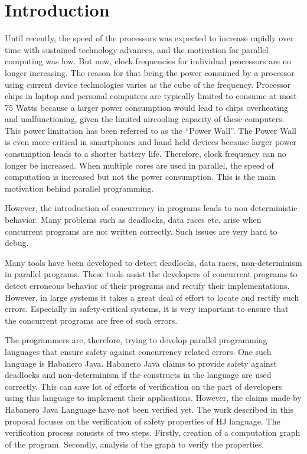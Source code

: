 \section{Introduction}

Until recently, the speed of the processors was expected to increase rapidly over time with sustained technology advances, and the motivation for parallel computing was low. But now, clock frequencies for individual processors are no longer increasing. The reason for that being the power consumed by a processor using current device technologies varies as the cube of the frequency. Processor chips in laptop and personal computers are typically limited to consume at most 75 Watts because a larger power consumption would lead to chips overheating and malfunctioning, given the limited air­cooling capacity of these computers. This power limitation has been referred to as the “Power Wall”. The Power Wall is even more critical in smart­phones and hand held devices because larger power consumption leads to a shorter battery life. Therefore, clock frequency can no longer be increased. When multiple cores are used in parallel, the speed of computation is increased but not the power consumption. This is the main motivation behind parallel programming.

 However, the introduction of concurrency in programs leads to non deterministic behavior. Many problems such as deadlocks, data races etc. arise when concurrent programs are not written correctly. Such issues are very hard to debug.
 
 Many tools have been developed to detect deadlocks, data races, non-determinism in parallel programs. These tools assist the developers of concurrent programs to detect erroneous behavior of their programs and rectify their implementations. However, in large systems it takes a great deal of effort to locate and rectify such errors. Especially in safety-critical systems, it is very important to ensure that the concurrent programs are free of such errors.
 
 The programmers are, therefore, trying to develop parallel programming languages that ensure safety against concurrency related errors. One such language is Habanero Java. Habanero Java claims to provide safety against deadlocks and non-determinism if the constructs in the language are used correctly. This can save lot of efforts of verification on the part of developers using this language to implement their applications. However, the claims made by Habanero Java Language have not been verified yet. The work described in this proposal focuses on the verification of safety properties of HJ language. The verification process consists of two steps. Firstly, creation of a computation graph of the program. Secondly, analysis of the graph to verify the properties. 
 
